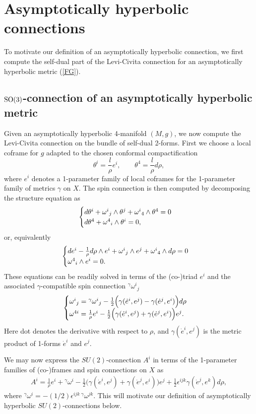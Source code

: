 \documentclass[a4paper,12pt]{article}
\newcommand{\be}{\begin{eqnarray}}
\newcommand{\ee}{\end{eqnarray}}
\begin{document}
\section{Asymptotically hyperbolic connections}
\label{sec:ah-conn}

To motivate our definition of an asymptotically hyperbolic connection, we first compute the self-dual part of the Levi-Civita connection for an asymptotically hyperbolic metric (\ref{FG}). 

\subsection{${\rm SO}(3)$-connection of an asymptotically hyperbolic metric}

Given an asymptotically hyperbolic 4-manifold $(M,g)$, we now compute the Levi-Civita connection on the bundle of self-dual 2-forms. First we choose a local coframe for $g$ adapted to the chosen conformal compactification
$$\theta^i=\frac{l}{\rho}e^i,\qquad\theta^4=\frac{l}{\rho}d\rho,$$
where $e^i$ denotes a 1-parameter family of local coframes for the 1-parameter family of metrics $\gamma$ on $X$. The spin connection is then computed by decomposing the structure equation as
$$\begin{cases}d\theta^i+\omega^i{}_j\wedge \theta^j+\omega^i{}_4\wedge \theta^4=0
\cr
d\theta^4+\omega^4{}_i\wedge \theta^i=0, \end{cases}$$
or, equivalently 
$$\begin{cases}
de^i-\frac{1}{\rho}d\rho\wedge e^i+\omega^i{}_j\wedge e^j+\omega^i{}_4\wedge d\rho=0
\cr
\omega^4{}_i\wedge e^i=0.\end{cases}$$
These equations can be readily solved in terms of the (co-)triad $e^i$ and the associated $\gamma$-compatible spin connection ${}^\gamma\omega^i{}_j$
$$\begin{cases}
\omega^i{}_j={}^\gamma\omega^i{}_j-\frac{1}{2}\Big(\gamma(\dot e^i,e^j)-\gamma(\dot e^j,e^i)\Big)d\rho
\cr
\omega^{4i}=\frac{1}{\rho}e^i-\frac{1}{2}\Big(\gamma(\dot e^i,e^j)+\gamma(\dot e^j,e^i)\Big)e^j.
\end{cases}$$
Here dot denotes the derivative with respect to $\rho$, and $\gamma(\dot e^i,e^j)$ is the metric product of 1-forms $\dot e^i$ and $e^j$. 

We may now express the $SU(2)$-connection $A^i$ in terms of the 1-parameter families of (co-)frames and spin connections on $X$ as
\be\label{A-metric}
A^i=\frac{1}{\rho}e^i+{}^\gamma\omega^i-\frac{1}{2}\Big(\gamma(\dot e^i,e^j)+\gamma(\dot e^j,e^i)\Big)e^j+\frac{1}{2}\epsilon^{ijk}\gamma(\dot e^j,e^k)d\rho,
\ee
where ${}^\gamma\omega^i=-(1/2)\epsilon^{ijk}\, {}^\gamma\omega^{jk}$. This will motivate our definition of asymptotically hyperbolic $SU(2)$-connections below.
\end{document}

